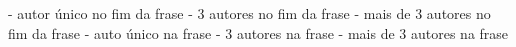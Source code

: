 - autor único no fim da frase \cite{Autor_bibtex} %
- 3 autores no fim da frase \cite{Autor_bibtex} %
- mais de 3 autores no fim da frase \cite{Autor_bibtex} %
- auto único na frase  %
- 3 autores na frase  %
- mais de 3 autores na frase  %